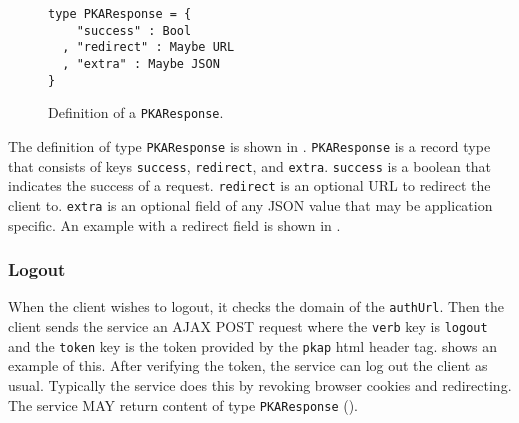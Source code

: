 \documentclass{article}
\newcommand{\todo}[1]{\textcolor{red}{#1}}
\begin{document}
\begin{figure}
\begin{lstlisting}
type PKAResponse = {
    "success" : Bool
  , "redirect" : Maybe URL
  , "extra" : Maybe JSON
}
\end{lstlisting}
\caption{Definition of a \texttt{PKAResponse}.}
\label{code:pkaresponse}
\end{figure}



The definition of type \texttt{PKAResponse} is shown in . 
\texttt{PKAResponse} is a record type that consists of keys \texttt{success}, \texttt{redirect}, and \texttt{extra}. 
\texttt{success} is a boolean that indicates the success of a request. 
\texttt{redirect} is an optional URL to redirect the client to. 
\texttt{extra} is an optional field of any JSON value that may be application specific. 
An example with a redirect field is shown in . 


\subsubsection{Logout}

When the client wishes to logout, it checks the domain of the \texttt{authUrl}. 
Then the client sends the service an AJAX POST request where the \texttt{verb} key is \texttt{logout} and the \texttt{token} key is the token provided by the \texttt{pkap} html header tag. 
 shows an example of this. 
After verifying the token, the service can log out the client as usual. 
Typically the service does this by revoking browser cookies and redirecting. 
The service MAY return content of type \texttt{PKAResponse} (). 

\end{document}
